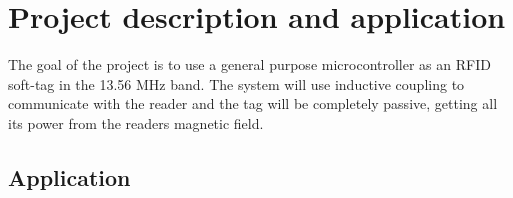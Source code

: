 \section{Project description and application}
The goal of the project is to use a general purpose microcontroller as an RFID soft-tag in the 13.56 MHz band.
The system will use inductive coupling to communicate with the reader and the tag will be completely passive, getting all its power from the readers magnetic field.

\subsection{Application}

